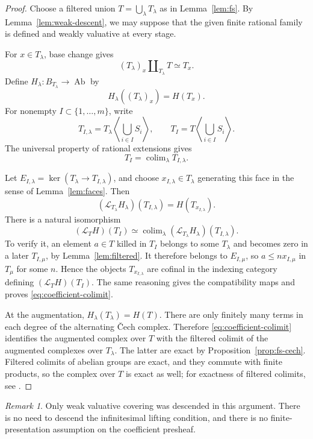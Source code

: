 \documentclass[11pt]{article}
\theoremstyle{definition}
\theoremstyle{remark}
\newtheorem{remark}[theorem]{Remark}
\DeclareMathOperator{\colim}{colim}
\DeclareMathOperator{\Ab}{Ab}
\newcommand{\LL}{\mathcal L}
\begin{document}
\begin{proof}
Choose a filtered union \(T=\bigcup_\lambda T_\lambda\) as in
Lemma~\ref{lem:fs}. By Lemma~\ref{lem:weak-descent}, we may suppose
that the given finite rational family is defined and weakly
valuative at every stage.

For \(x\in T_\lambda\), base change gives
\[
(T_\lambda)_x\amalg_{T_\lambda}T\simeq T_x.
\]
Define \(H_\lambda:B_{T_\lambda}\to\Ab\) by
\[
H_\lambda((T_\lambda)_x)=H(T_x).
\]
For nonempty \(I\subset\{1,\ldots,m\}\), write
\[
T_{I,\lambda}
=T_\lambda\left\langle\bigcup_{i\in I}S_i\right\rangle,
\qquad
T_I=T\left\langle\bigcup_{i\in I}S_i\right\rangle.
\]
The universal property of rational extensions gives
\[
T_I=\colim_\lambda T_{I,\lambda}.
\]

Let \(E_{I,\lambda}=\ker(T_\lambda\to T_{I,\lambda})\), and choose
\(x_{I,\lambda}\in T_\lambda\) generating this face 
in the sense
of Lemma~\ref{lem:faces}. Then
\[
(\LL_{T_\lambda}H_\lambda)(T_{I,\lambda})
=H(T_{x_{I,\lambda}}).
\]
There is a natural isomorphism
\begin{equation}\label{eq:coefficient-colimit}
(\LL_TH)(T_I)
\simeq
\colim_\lambda
(\LL_{T_\lambda}H_\lambda)(T_{I,\lambda}).
\end{equation}
To verify it, an element \(a\in T\) killed in \(T_I\) belongs to
some \(T_\lambda\) and becomes zero in a later
\(T_{I,\mu}\), by Lemma~\ref{lem:filtered}. It therefore belongs
to \(E_{I,\mu}\), so \(a\le n x_{I,\mu}\) in \(T_\mu\) for some
\(n\). Hence the objects \(T_{x_{I,\lambda}}\) are cofinal in
the indexing category defining \((\LL_TH)(T_I)\).
The same reasoning gives the compatibility maps and proves
\eqref{eq:coefficient-colimit}.

At the augmentation,
\(H_\lambda(T_\lambda)=H(T)\).
There are only finitely many terms in each degree of the
alternating \v{C}ech complex. Therefore
\eqref{eq:coefficient-colimit} identifies the augmented complex
over \(T\) with the filtered colimit of the augmented complexes
over \(T_\lambda\).
The latter are exact by Proposition~\ref{prop:fs-cech}.
Filtered colimits of abelian groups are exact, and they commute
with finite products, so the complex over \(T\) is exact as well;
for exactness of filtered colimits, see
\cite[Tag~00DB]{Stacks}.
\end{proof}

\begin{remark}
Only weak valuative covering was descended in this argument.
There is no need to descend the infinitesimal lifting condition,
and there is no finite-presentation assumption on the coefficient
presheaf.
\end{remark}
\end{document}
